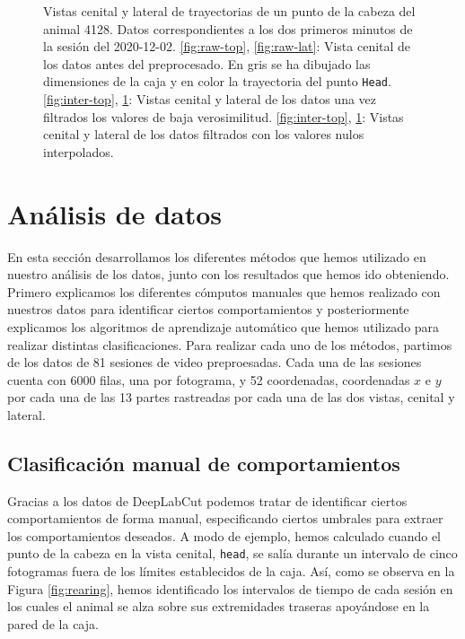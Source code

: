 \begin{figure}[p]
\begin{subfigure}{0.38\textwidth}
    \caption{}
    \label{fig:inter-lat}
  \end{subfigure}
  \caption[Trayectorias durante el preprocesamiento.]{Vistas cenital y lateral de trayectorias de un punto de la cabeza del animal 4128. Datos correspondientes a los dos primeros minutos de la sesión del 2020-12-02. \ref{fig:raw-top}, \ref{fig:raw-lat}: Vista cenital de los datos antes del preprocesado. En gris se ha dibujado las dimensiones de la caja y en color la trayectoria del punto \texttt{Head}. \ref{fig:inter-top}, \ref{fig:inter-lat}: Vistas cenital y lateral de los datos una vez filtrados los valores de baja verosimilitud. \ref{fig:inter-top}, \ref{fig:inter-lat}: Vistas cenital y lateral de los datos filtrados con los valores nulos interpolados. }
  \label{fig:interpolated-trayectories}
\end{figure}

\section{Análisis de datos} \label{sec:analisis}
En esta sección desarrollamos los diferentes métodos que hemos utilizado en nuestro análisis de los datos, junto con los resultados que hemos ido obteniendo. Primero explicamos los diferentes cómputos manuales que hemos realizado con nuestros datos para identificar ciertos comportamientos y posteriormente explicamos los algoritmos de aprendizaje automático que hemos utilizado para realizar distintas clasificaciones. Para realizar cada uno de los métodos, partimos de los datos de 81 sesiones de video preproesadas. Cada una de las sesiones cuenta con 6000 filas, una por fotograma, y 52 coordenadas, coordenadas $ x $ e $ y $ por cada una de las 13 partes rastreadas por cada una de las dos vistas, cenital y lateral.

\subsection{Clasificación manual de comportamientos}
Gracias a los datos de DeepLabCut podemos tratar de identificar ciertos comportamientos de forma manual, especificando ciertos umbrales para extraer los comportamientos deseados. A modo de ejemplo, hemos calculado cuando el punto de la cabeza en la vista cenital, \texttt{head}, se salía durante un intervalo de cinco fotogramas fuera de los límites establecidos de la caja. Así, como se observa en la Figura \ref{fig:rearing}, hemos identificado los intervalos de tiempo de cada sesión en los cuales el animal se alza sobre sus extremidades traseras apoyándose en la pared de la caja.

